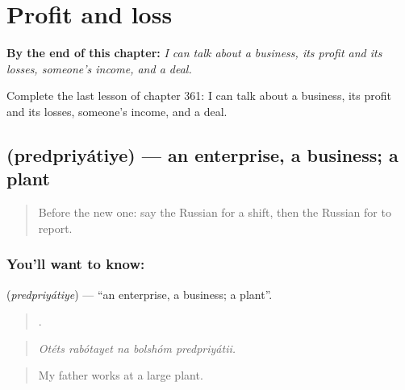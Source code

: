 
\chapter{Profit and loss}
\label{ch:ru-profit-and-loss}

\begin{chapteropening}
\textbf{By the end of this chapter:} \emph{I can talk about a business, its profit and its losses, someone’s income, and a deal.}

Complete the last lesson of chapter 361: I can talk about a business, its profit and its losses, someone’s income, and a deal.
\end{chapteropening}

\section[\texorpdfstring{\ru{предприятие} (predpriyátiye)}{предприятие (predpriyátiye)}]{ (predpriyátiye) — an enterprise, a business; a plant}

\label{lesson:RU-C361-predpriyatie}



\begin{quote}
Before the new one: say the Russian for a shift, then the Russian for to report.
\end{quote}

\subsection*{You'll want to know: }
\textbf{} (\emph{predpriyátiye}) — \textquotedblleft{}an enterprise, a business; a plant\textquotedblright{}.

\begin{quote}
    .
\end{quote}

\begin{quote}
\emph{Otéts rabótayet na bolshóm predpriyátii.}
\end{quote}

\begin{quote}
My father works at a large plant.
\end{quote}

